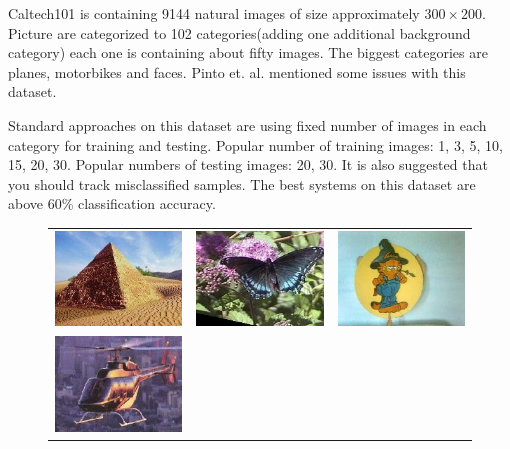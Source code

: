 Caltech101 is containing 9144 natural images of size approximately \(300\times200\). Picture are categorized to 102 categories(adding one additional background category) each one is containing about fifty images. The biggest categories are planes, motorbikes and faces. Pinto et. al. mentioned some issues with this dataset. 

Standard approaches on this dataset are using fixed number of images in each category for training and testing. Popular number of training images: 1, 3, 5, 10, 15, 20, 30. Popular numbers of testing images: 20, 30. It is also suggested that you should track misclassified samples. The best systems on this dataset are above 60\% classification accuracy. 

\begin{figure}[h]
\centering
{\renewcommand{\arraystretch}{0}
\setlength{\tabcolsep}{0cm}
\begin{tabular}{c c c}
\includegraphics[scale=0.2]{./pictures/caltech_1.jpg} & 
\includegraphics[scale=0.2]{./pictures/caltech_2.jpg} &
\includegraphics[scale=0.2]{./pictures/caltech_3.jpg} \\
\includegraphics[scale=0.2]{./pictures/caltech_4.jpg} &

\end{tabular}}
\end{figure}
